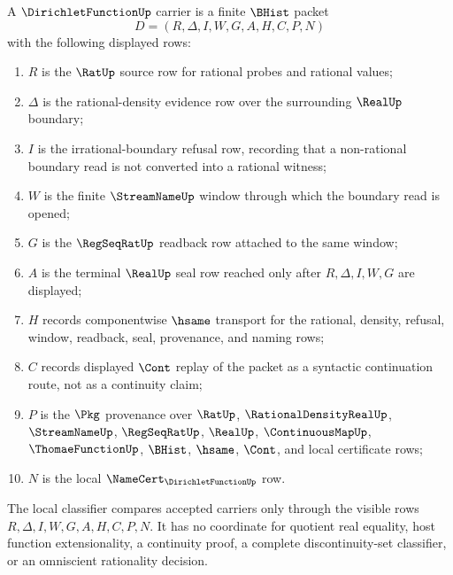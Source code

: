 \begin{definition}
\label{def:dirichlet-function-carrier}
A $\DirichletFunctionUp$ carrier is a finite $\BHist$ packet
$$
D=(R,\Delta,I,W,G,A,H,C,P,N)
$$
with the following displayed rows:
\begin{enumerate}
\item $R$ is the $\RatUp$ source row for rational probes and rational values;
\item $\Delta$ is the rational-density evidence row over the surrounding $\RealUp$ boundary;
\item $I$ is the irrational-boundary refusal row, recording that a non-rational boundary read is not converted into a rational witness;
\item $W$ is the finite $\StreamNameUp$ window through which the boundary read is opened;
\item $G$ is the $\RegSeqRatUp$ readback row attached to the same window;
\item $A$ is the terminal $\RealUp$ seal row reached only after $R,\Delta,I,W,G$ are displayed;
\item $H$ records componentwise $\hsame$ transport for the rational, density, refusal, window, readback, seal, provenance, and naming rows;
\item $C$ records displayed $\Cont$ replay of the packet as a syntactic continuation route, not as a continuity claim;
\item $P$ is the $\Pkg$ provenance over $\RatUp$, $\RationalDensityRealUp$, $\StreamNameUp$, $\RegSeqRatUp$, $\RealUp$, $\ContinuousMapUp$, $\ThomaeFunctionUp$, $\BHist$, $\hsame$, $\Cont$, and local certificate rows;
\item $N$ is the local $\NameCert_{\DirichletFunctionUp}$ row.
\end{enumerate}
The local classifier compares accepted carriers only through the visible rows $R,\Delta,I,W,G,A,H,C,P,N$. It has no coordinate for quotient real equality, host function extensionality, a continuity proof, a complete discontinuity-set classifier, or an omniscient rationality decision.
\end{definition}

